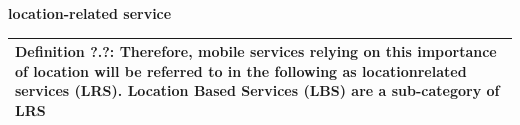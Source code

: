 \textbf{location-related service} \\
\begin{table}[h]
	\centering
	\begin{tabular}{|p{16cm}|}\hline
		\textbf{Definition ?.?:} \glqq Therefore, mobile services relying on this importance of location will be referred to in the following as locationrelated services (LRS). Location Based Services (LBS) are a sub-category of LRS \grqq \cite[S.5]{strueker2003}\\ \hline
	\end{tabular}
\end{table}





